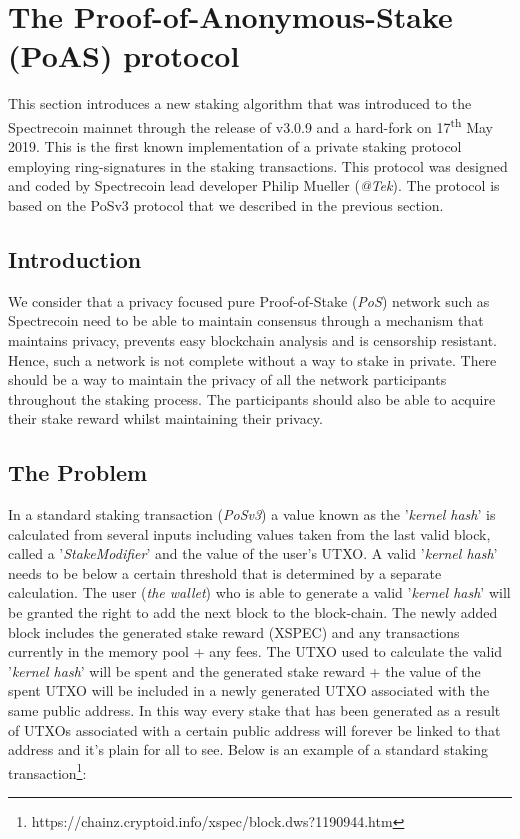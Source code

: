 \chapter{The Proof-of-Anonymous-Stake (PoAS) protocol}
This section introduces a new staking algorithm that was introduced to the 
Spectrecoin mainnet through the release of v3.0.9 and a hard-fork on 
17\textsuperscript{th} May 2019. This is the first known implementation 
of a private staking protocol employing ring-signatures in the staking 
transactions. This protocol was designed and coded by Spectrecoin lead 
developer Philip Mueller (\textit{@Tek}). The protocol is based on the 
PoSv3 protocol that we described in the previous section.



\section{Introduction}
We consider that a privacy focused pure Proof-of-Stake (\textit{PoS}) 
network such as Spectrecoin need to be able to maintain consensus through 
a mechanism that maintains privacy, prevents easy blockchain analysis and 
is censorship resistant. Hence, such a network is not complete without a 
way to stake in private. There should be a way to maintain the privacy of 
all the network participants throughout the staking process. The 
participants should also be able to acquire their stake reward whilst 
maintaining their privacy.



\section{The Problem}

In a standard staking transaction (\textit{PoSv3}) a value known as the 
'\textit{kernel hash}' is calculated from several inputs including values 
taken from the last valid block, called a '\textit{StakeModifier}' and 
the value of the user's UTXO. A valid '\textit{kernel hash}' needs to be 
below a certain threshold that is determined by a separate calculation. 
The user (\textit{the wallet}) who is able to generate a valid 
'\textit{kernel hash}' will be granted the right to add the next block 
to the block-chain. The newly added block includes the generated stake 
reward (XSPEC) and any transactions currently in the memory pool + any 
fees. The UTXO used to calculate the valid '\textit{kernel hash}' will 
be spent and the generated stake reward + the value of the spent UTXO 
will be included in a newly generated UTXO associated with the same public 
address. In this way every stake that has been generated as a result of 
UTXOs associated with a certain public address will forever be linked to 
that address and it's plain for all to see. Below is an example of a 
standard staking transaction\footnote{https://chainz.cryptoid.info/xspec/block.dws?1190944.htm}: 



